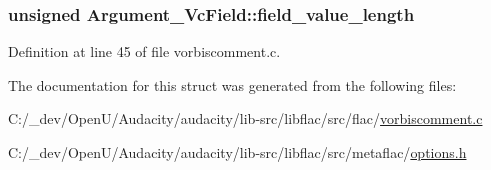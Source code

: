 \subsubsection[{\texorpdfstring{field\+\_\+value\+\_\+length}{field_value_length}}]{\setlength{\rightskip}{0pt plus 5cm}unsigned Argument\+\_\+\+Vc\+Field\+::field\+\_\+value\+\_\+length}\hypertarget{struct_argument___vc_field_ad062c64c6b87e6dabe6994184d11e69c}{}\label{struct_argument___vc_field_ad062c64c6b87e6dabe6994184d11e69c}


Definition at line 45 of file vorbiscomment.\+c.



The documentation for this struct was generated from the following files\+:\begin{DoxyCompactItemize}
\item 
C\+:/\+\_\+dev/\+Open\+U/\+Audacity/audacity/lib-\/src/libflac/src/flac/\hyperlink{vorbiscomment_8c}{vorbiscomment.\+c}\item 
C\+:/\+\_\+dev/\+Open\+U/\+Audacity/audacity/lib-\/src/libflac/src/metaflac/\hyperlink{libflac_2src_2metaflac_2options_8h}{options.\+h}\end{DoxyCompactItemize}
